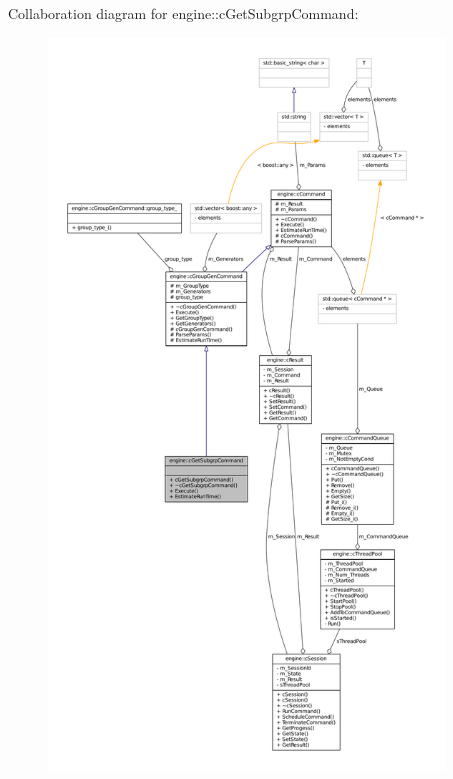 \-Collaboration diagram for engine\-:\-:c\-Get\-Subgrp\-Command\-:\nopagebreak
\begin{figure}[H]
\begin{center}
\leavevmode
\includegraphics[height=550pt]{classengine_1_1cGetSubgrpCommand__coll__graph}
\end{center}
\end{figure}
